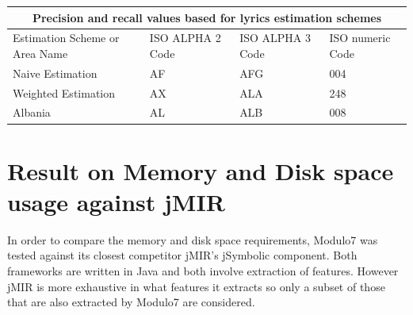 \begin{tabular}{ |p{4cm}||p{3cm}|p{3cm}|p{3cm}|  }
 \hline
 \multicolumn{4}{|c|}{Precision and recall values based for lyrics estimation schemes} \\
 \hline
 Estimation Scheme     or Area Name& ISO ALPHA 2 Code &ISO ALPHA 3 Code&ISO numeric Code\\
 \hline
 Naive Estimation   & AF    &AFG&   004\\
 Weighted Estimation &   AX  & ALA   &248\\
 Albania &AL & ALB&  008\\
 \hline 
\end{tabular}

\section{Result on Memory and Disk space usage against jMIR}

\noindent In order to compare the memory and disk space requirements, Modulo7 was tested against its closest competitor jMIR's \cite{jMIR} jSymbolic component. Both frameworks are written in Java and both involve extraction of features. However jMIR is more exhaustive in what features it extracts so only a subset of those that are also extracted by Modulo7 are considered. 